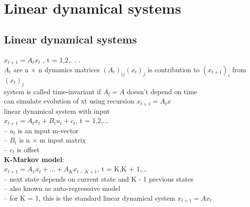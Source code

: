 \section{Linear dynamical systems}
\subsection{Linear dynamical systems}
$x_{t+1} = A_tx_t$ , t = 1,2,. . .\\
\textbullet $A_t$ are n × n dynamics matrices
\textbullet $(A_t)_{ij}(x_t)_j$
is contribution to $(x_{t+1})_i$
from $(x_t)_j$\\
\textbullet system is called time-invariant if $A_t = A$ doesn't depend on time\\
\textbullet can simulate evolution of xt using recursion $x_{t+1} = A_tx$\\
\textbullet linear dynamical system with input\\
$x_{t+1} = A_tx_t + B_tu_t + c_t$, t = 1,2,...\\
\thickspace -- $u_t$ is an input m-vector\\
\thickspace -- $B_t$ is n × m input matrix\\
\thickspace -- $c_t$ is offset\\
\textbf{K-Markov model}:\\
$x_{t+1} = A_1x_t + ... + A_Kx_{t-K+1}$, t = K,K + 1,...\\
\thickspace -- next state depends on current state and K - 1 previous states\\
\thickspace – also known as auto-regresssive model\\
\thickspace – for K = 1, this is the standard linear dynamical system $x_{t+1} = Ax_t$\\
